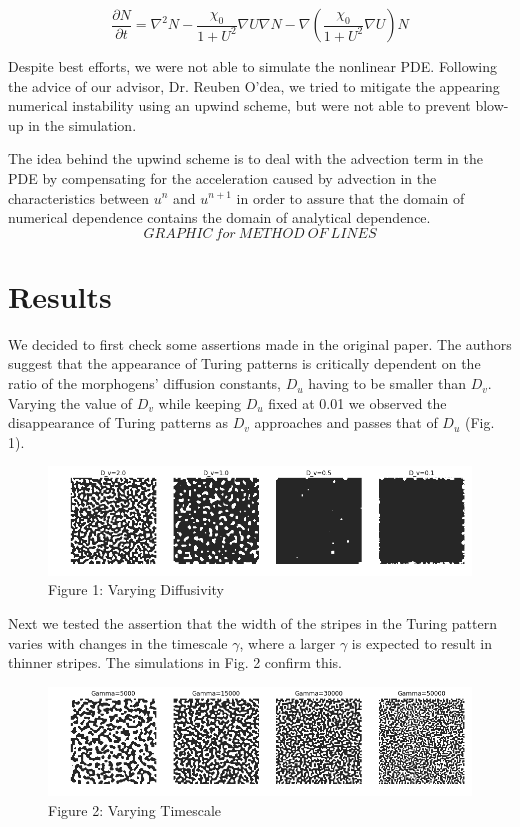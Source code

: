 \documentclass[12pt]{article}
\begin{document}
 $$\frac{\partial N}{\partial t}=\nabla^2N-\frac{\chi_0}{1+U^2}\nabla U \nabla N- \nabla(\frac{\chi_0}{1+U^2}\nabla U)N$$
 
 Despite best efforts, we were not able to simulate the nonlinear PDE. Following the advice of our advisor, Dr. Reuben O'dea, we tried to mitigate the appearing numerical instability using an upwind scheme, but were not able to prevent blow-up in the simulation.
 
 The idea behind the upwind scheme is to deal with the advection term in the PDE by compensating for the acceleration caused by advection in the characteristics between $u^n$ and $u^{n+1}$ in order to assure that the domain of numerical dependence contains the domain of analytical dependence.
 $$GRAPHIC\ for\ METHOD\ OF\ LINES$$
 
 \pagebreak
 
 \section{Results}
 
 We decided to first check some assertions made in the original paper. The authors suggest that the appearance of Turing patterns is critically dependent on the ratio of the morphogens' diffusion constants, $D_u$ having to be smaller than $D_v$. Varying the value of $D_v$ while keeping $D_u$ fixed at 0.01 we observed the disappearance of Turing patterns as $D_v$ approaches and passes that of $D_u$ (Fig. 1).
 
 \begin{figure}[h!]
 	\includegraphics[width=\linewidth]{diffusivity.png}
 	\caption{Figure 1: Varying Diffusivity}
 	\label{fig:dv}
 \end{figure}
 
 Next we tested the assertion that the width of the stripes in the Turing pattern varies with changes in the timescale $\gamma$, where a larger $\gamma$ is expected to result in thinner stripes. The simulations in Fig. 2 confirm this.
 
 \begin{figure}[h!]
 	\includegraphics[width=\linewidth]{timescale.png}
 	\caption{Figure 2: Varying Timescale}
 	\label{fig:gamma}
 \end{figure}
 
\end{document}

